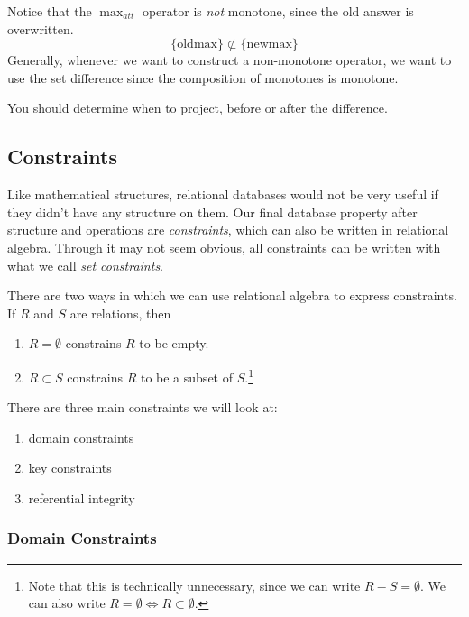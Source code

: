 \documentclass{article}
\begin{document}
      Notice that the $\max_{att}$ operator is \textit{not} monotone, since the old answer is overwritten. 
      \begin{equation}
        \{\mathrm{old max}\} \not\subset \{\mathrm{new max}\}
      \end{equation}
      Generally, whenever we want to construct a non-monotone operator, we want to use the set difference since the composition of monotones is monotone. 

      You should determine when to project, before or after the difference. 

  \subsection{Constraints} 

    Like mathematical structures, relational databases would not be very useful if they didn't have any structure on them. Our final database property after structure and operations are \textit{constraints}, which can also be written in relational algebra. Through it may not seem obvious, all constraints can be written with what we call \textit{set constraints}. 

    \begin{definition}
      There are two ways in which we can use relational algebra to express constraints. If $R$ and $S$ are relations, then 
      \begin{enumerate}
        \item $R = \emptyset$ constrains $R$ to be empty.
        \item $R \subset S$ constrains $R$ to be a subset of $S$.\footnote{Note that this is technically unnecessary, since we can write $R - S = \emptyset$. We can also write $R = \emptyset \iff R \subset \emptyset$.}
      \end{enumerate}
    \end{definition} 

    There are three main constraints we will look at: 
    \begin{enumerate}
      \item domain constraints 
      \item key constraints 
      \item referential integrity
    \end{enumerate}

    \subsubsection{Domain Constraints}
\end{document}
